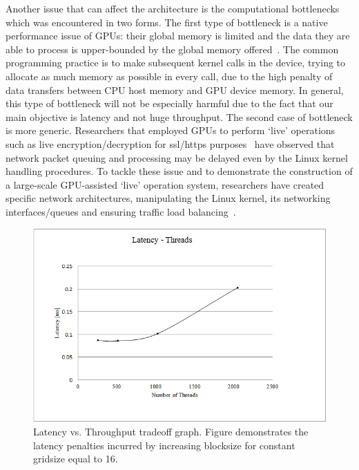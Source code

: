 \documentclass[11pt,twocolumn]{IEEEtran}
\begin{document}
Another issue that can affect the architecture is the computational bottlenecks which was encountered in two forms.  The first type of bottleneck is a native performance issue of GPUs: their global memory is limited and the data they are able to process is upper-bounded by the global memory offered~\cite{cudaguide}. The common programming practice is to make subsequent kernel calls in the device, trying to allocate as much memory as possible in every call, due to the high penalty of data transfers between CPU host memory and GPU device memory. In general, this type of bottleneck will not be especially harmful due to the fact that our main objective is latency and not huge throughput. The second case of bottleneck is more generic. Researchers that employed GPUs to perform `live' operations such as live encryption/decryption for ssl/https purposes~\cite{kaist} have observed that network packet queuing and processing may be delayed even by the Linux kernel handling procedures. To tackle these issue and to demonstrate the construction of a large-scale GPU-assisted `live' operation system, researchers have created specific network architectures, manipulating the Linux kernel, its networking interfaces/queues and ensuring traffic load balancing~\cite{midea}.
\begin{figure}
\centering
\includegraphics[scale=0.35]{latencygraph.png}

\caption{Latency vs. Throughput tradeoff graph. Figure demonstrates
 the latency penalties incurred by increasing blocksize for constant gridsize equal to 16.}
\label{lat}
\end{figure}
\end{document}

